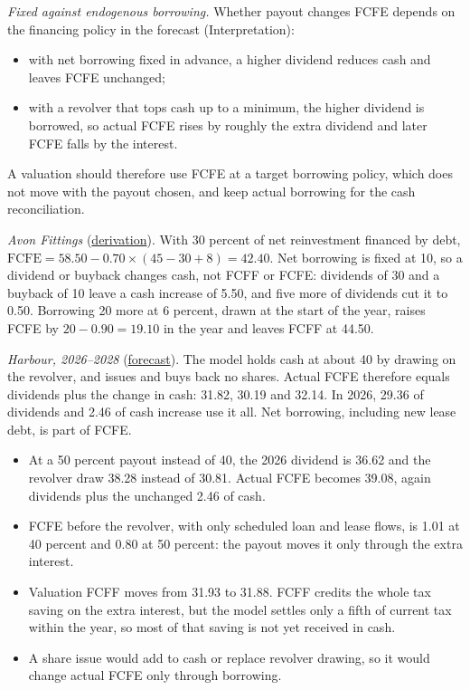 \begin{qfmethod}
\emph{Fixed against endogenous borrowing.} Whether payout changes FCFE depends on the financing policy in the forecast (Interpretation):
\begin{itemize}
\item with net borrowing fixed in advance, a higher dividend reduces cash and leaves FCFE unchanged;
\item with a revolver that tops cash up to a minimum, the higher dividend is borrowed, so actual FCFE rises by roughly the extra dividend and later FCFE falls by the interest.
\end{itemize}
A valuation should therefore use FCFE at a target borrowing policy, which does not move with the payout chosen, and keep actual borrowing for the cash reconciliation.

 \emph{Avon Fittings} (\hyperref[meth:fcff-fcfe-derivation]{derivation}). With 30 percent of net reinvestment financed by debt, $\mathrm{FCFE}=58.50-0.70\times(45-30+8)=42.40$. Net borrowing is fixed at 10, so a dividend or buyback changes cash, not FCFF or FCFE: dividends of 30 and a buyback of 10 leave a cash increase of 5.50, and five more of dividends cut it to 0.50. Borrowing 20 more at 6 percent, drawn at the start of the year, raises FCFE by $20-0.90=19.10$ in the year and leaves FCFF at 44.50.

\emph{Harbour, 2026--2028} (\hyperref[ex:harbour-pro-forma-model]{forecast}). The model holds cash at about 40 by drawing on the revolver, and issues and buys back no shares. Actual FCFE therefore equals dividends plus the change in cash: 31.82, 30.19 and 32.14. In 2026, 29.36 of dividends and 2.46 of cash increase use it all. Net borrowing, including new lease debt, is part of FCFE.
\begin{itemize}
\item At a 50 percent payout instead of 40, the 2026 dividend is 36.62 and the revolver draw 38.28 instead of 30.81. Actual FCFE becomes 39.08, again dividends plus the unchanged 2.46 of cash.
\item FCFE before the revolver, with only scheduled loan and lease flows, is 1.01 at 40 percent and 0.80 at 50 percent: the payout moves it only through the extra interest.
\item Valuation FCFF moves from 31.93 to 31.88. FCFF credits the whole tax saving on the extra interest, but the model settles only a fifth of current tax within the year, so most of that saving is not yet received in cash.
\item A share issue would add to cash or replace revolver drawing, so it would change actual FCFE only through borrowing.
\end{itemize}


\end{qfmethod}
